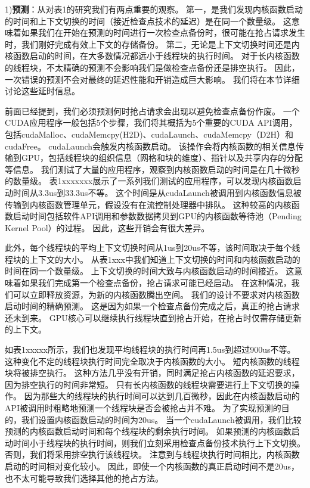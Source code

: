 1)\textbf{预测}：从对表1的研究我们有两点重要的观察。
第一，是我们发现内核函数启动的时间和上下文切换的时间（接近检查点技术的延迟）是在同一个数量级。
这意味着如果我们在开始在预测的时间进行一次检查点备份时，很可能在抢占请求发生时，我们刚好完成有效上下文的存储备份。
第二，无论是上下文切换时间还是内核函数启动的时间，在大多数情况都远小于线程块的执行时间。
对于长内核函数的线程块，不太精确的预测不会影响我们是做检查点备份还是排空执行。
因此，一次错误的预测不会对最终的延迟性能和开销造成巨大影响。
我们将在本节详细讨论这些延时信息。

前面已经提到，我们必须预测何时抢占请求会出现以避免检查点备份作废。
一个CUDA应用程序一般包括5个步骤，我们将其概括为5个重要的CUDA API调用，包括cudaMalloc、cudaMemcpy(H2D)、cudaLaunch、cudaMemcpy（D2H）和cudaFree。
cudaLaunch会触发内核函数启动。
该操作会将内核函数的相关信息传输到GPU，包括线程块的组织信息（网格和块的维度）、指针以及共享内存的分配等信息。
我们测试了大量的应用程序，观察到内核函数启动的时间是在几十微秒的数量级。
表1xxxxxxx展示了一系列我们测试的应用程序，可以发现内核函数启动时间从3.3us到33.3us不等。
这个时间是从cudaLaunch被调用到内核函数信息被传输到内核函数管理单元，假设没有在流控制处理器中排队。
这种较高的内核函数启动时间包括软件API调用和参数数据拷贝到GPU的内核函数等待池（Pending Kernel Pool）的过程。
因此，这些开销会有很大差异。

此外，每个线程块的平均上下文切换时间从1us到20us不等，该时间取决于每个线程块的上下文的大小。
从表1xxx中我们知道上下文切换的时间和内核函数启动的时间在同一个数量级。
上下文切换的时间大致与内核函数启动的时间接近。
这意味着如果我们完成第一个检查点备份，抢占请求可能已经启动。
在这种情况，我们可以立即释放资源，为新的内核函数腾出空间。
我们的设计不要求对内核函数启动时间的精确预测。
这是因为如果一个检查点备份完成之后，真正的抢占请求还未到来。
GPU核心可以继续执行线程块直到抢占开始，在抢占时仅需存储更新的上下文。

如表1xxxxx所示，我们也发现平均线程块的执行时间再1.5us到超过900us不等。
这种变化不定的线程块执行时间完全取决于内核函数的大小。
短内核函数的线程块将被排空执行。
这种方法几乎没有开销，同时满足抢占内核函数的延迟要求，因为排空执行的时间非常短。
只有长内核函数的线程块需要进行上下文切换的操作。
因为那些大的线程块的执行时间可以达到几百微秒，因此在内核函数启动的API被调用时粗略地预测一个线程块是否会被抢占并不难。
为了实现预测的目的，我们设置内核函数启动的时间为20us。
当一个cudaLaunch被调用，我们比较预测的内核函数启动时间和每个线程块的剩余执行时间。
如果预测的内核函数启动时间小于线程块的执行时间，则我们立刻采用检查点备份技术执行上下文切换。
否则，我们将采用排空执行该线程块。
注意到与线程块执行时间相比，内核函数启动的时间相对变化较小。
因此，即使一个内核函数的真正启动时间不是20us，也不太可能导致我们选择其他的抢占方法。

